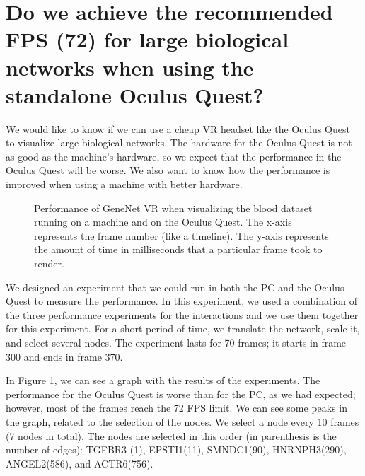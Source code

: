 \section{Do we achieve the recommended FPS (72) for large biological networks when using the standalone Oculus Quest?}
We would like to know if we can use a cheap VR headset like the Oculus Quest to visualize large biological networks. The hardware for the Oculus Quest is not as good as the machine's hardware, so we expect that the performance in the Oculus Quest will be worse. We also want to know how the performance is improved when using a machine with better hardware.

\begin{figure}[h!]
  \centering
  \begin{minipage}{.8\textwidth}
  \end{minipage}
\caption{Performance of GeneNet VR when visualizing the blood dataset running on a machine and on the Oculus Quest. The x-axis represents the frame number (like a timeline). The y-axis represents the amount of time in milliseconds that a particular frame took to render.}
\label{fig:pc_vs_oculus}
\end{figure}

We designed an experiment that we could run in both the PC and the Oculus Quest to measure the performance. In this experiment, we used a combination of the three performance experiments for the interactions and we use them together for this experiment. For a short period of time, we translate the network, scale it, and select several nodes. The experiment lasts for 70 frames; it starts in frame 300 and ends in frame 370.

In Figure \ref{fig:pc_vs_oculus}, we can see a graph with the results of the experiments. The performance for the Oculus Quest is worse than for the PC, as we had expected; however, most of the frames reach the 72 FPS limit. We can see some peaks in the graph, related to the selection of the nodes. We select a node every 10 frames (7 nodes in total). The nodes are selected in this order (in parenthesis is the number of edges): TGFBR3 (1), EPSTI1(11), SMNDC1(90), HNRNPH3(290), ANGEL2(586), and ACTR6(756).

